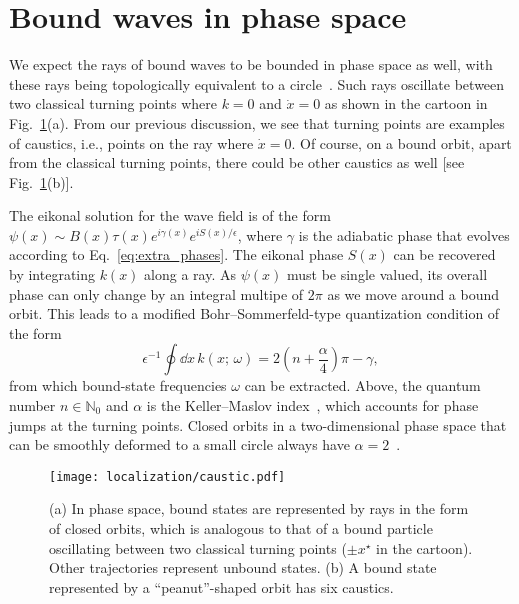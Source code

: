 \section{Bound waves in phase space}
\label{sec:bound}

We expect the rays of bound waves to be bounded in phase space as well, with these rays being topologically equivalent to a circle~\cite{keller1958,mcdonald1988}.
Such rays oscillate between two classical turning points where $k = 0$ and $\dot{x} = 0$ as shown in the cartoon in Fig.~\ref{fig:caustic}(a).
From our previous discussion, we see that turning points are examples of caustics, i.e., points on the ray where $\dot{x} = 0$.
Of course, on a bound orbit, apart from the classical turning points, there could be other caustics as well [see Fig.~\ref{fig:caustic}(b)].

The eikonal solution for the wave field is of the form $\psi(x) \sim B(x)\tau(x) e^{i\gamma(x)} e^{iS(x)/\epsilon}$, where $\gamma$ is the adiabatic phase that evolves according to Eq.~\eqref{eq:extra_phases}.
The eikonal phase $S(x)$ can be recovered by integrating $k(x)$ along a ray.
As $\psi(x)$ must be single valued, its overall phase can only change by an integral multipe of $2\pi$ as we move around a bound orbit.
This leads to a modified Bohr--Sommerfeld-type quantization condition of the form
%
\begin{equation}
  \epsilon^{-1}\oint \dd{x}\,k(x;\, \omega) = 2\left(n + \frac{\alpha}{4}\right)\pi - \gamma,
  \label{eq:quantization}
\end{equation}
%
from which bound-state frequencies $\omega$ can be extracted.
Above, the quantum number $n \in \mathbb{N}_{0}$ and $\alpha$ is the Keller--Maslov index~\cite{keller1958,maslov1981}, which accounts for phase jumps at the turning points.
Closed orbits in a two-dimensional phase space that can be smoothly deformed to a small circle always have $\alpha = 2$~\cite{percival1977}.
%
\begin{figure}
  \begin{center}
    \texttt{[image: localization/caustic.pdf]}
  \end{center}
  \caption{%
    (a) In phase space, bound states are represented by rays in the form of closed orbits, which is analogous to that of a bound particle oscillating between two classical turning points ($\pm x^{\star}$ in the cartoon).
    Other trajectories represent unbound states.
    (b) A bound state represented by a ``peanut''-shaped orbit has six caustics.%
  }
  \label{fig:caustic}
\end{figure}

